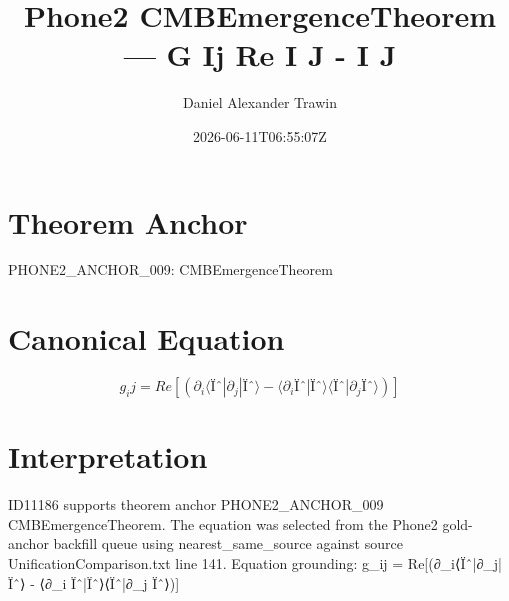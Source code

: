 \documentclass[11pt]{article}
\title{Phone2 CMBEmergenceTheorem — G Ij Re I J - I J}
\author{Daniel Alexander Trawin}
\date{2026-06-11T06:55:07Z}
\begin{document}
\maketitle
\section*{Theorem Anchor}
PHONE2_ANCHOR_009: CMBEmergenceTheorem
\section*{Canonical Equation}
\[
g_ij = Re[(∂_i⟨Ïˆ|∂_j|Ïˆ⟩ - ⟨∂_i Ïˆ|Ïˆ⟩⟨Ïˆ|∂_j Ïˆ⟩)]
\]
\section*{Interpretation}
ID11186 supports theorem anchor PHONE2_ANCHOR_009 CMBEmergenceTheorem. The equation was selected from the Phone2 gold-anchor backfill queue using nearest_same_source against source UnificationComparison.txt line 141. Equation grounding: g_ij = Re[(∂_i⟨Ïˆ|∂_j|Ïˆ⟩ - ⟨∂_i Ïˆ|Ïˆ⟩⟨Ïˆ|∂_j Ïˆ⟩)]
\end{document}
